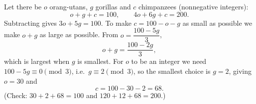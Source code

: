 Let there be $o$ orang-utans, $g$ gorillas and $c$ chimpanzees (nonnegative integers):
\[
o+g+c=100,\qquad 4o+6g+c=200 .
\]
Subtracting gives $3o+5g=100$. To make $c=100-o-g$ as small as possible we make $o+g$ as large as possible. From $o=\dfrac{100-5g}{3}$,
\[
o+g=\dfrac{100-2g}{3},
\]
which is largest when $g$ is smallest. For $o$ to be an integer we need $100-5g\equiv0\pmod 3$, i.e.\ $g\equiv2\pmod3$, so the smallest choice is $g=2$, giving $o=30$ and
\[
c=100-30-2=\boxed{68}.
\]
(Check: $30+2+68=100$ and $120+12+68=200$.)
